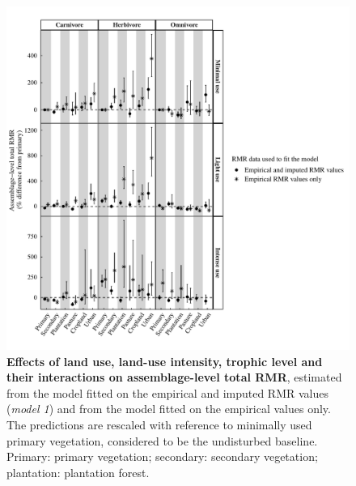 \begin{figure}[h!]
\centering\includegraphics[scale=0.8]{Supporting/Chapter5/Figures/Complete_VS_imputed_total}
\caption[Effects of land use, land-use intensity, trophic level and their interactions on assemblage-level total RMR: empirical versus imputed]{\textbf{Effects of land use, land-use intensity, trophic level and their interactions on assemblage-level total RMR}, estimated from the model fitted on the empirical and imputed RMR values (\textit{model 1}) and from the model fitted on the empirical values only. The predictions are rescaled with reference to minimally used primary vegetation, considered to be the undisturbed baseline. Primary: primary vegetation; secondary: secondary vegetation; plantation: plantation forest.}
\label{SI5_figure5}
\end{figure}


